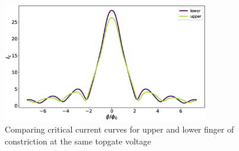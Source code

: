 \documentclass[a4paper]{article}
\begin{document}
\begin{figure}
\centering
\includegraphics[width=0.8\textwidth]{hb_comparison}
\caption{Comparing critical current curves for upper and lower finger of constriction at the same topgate voltage}
\end{figure}
\end{document}
